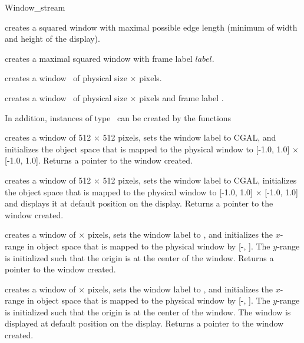 \begin{ccRefClass} {Window_stream}
\ccCreation

{creates a squared window with maximal possible edge length
(minimum of width and height of the display).}

{creates a maximal squared window with frame label $label$.}

{creates a window \ccVar\ of physical size  $\times$  pixels.}


{creates a window \ccVar\ of physical size  $\times$  pixels 
and frame label .}

In addition, instances of type \ccRefName\ can be created by the functions

{creates a window of 512 $\times$ 512 pixels, sets the window label to
CGAL, and  initializes the object space that is mapped to the physical window to
[-1.0, 1.0] $\times$ [-1.0, 1.0]. 
Returns a pointer to the window created.}

{creates a window of 512 $\times$ 512 pixels, sets the window label to
CGAL, initializes the object space that is mapped to the physical window to 
[-1.0, 1.0] $\times$ [-1.0, 1.0] and 
displays it at default position on the display. Returns a pointer to the window created.}

{creates a window of  $\times$  pixels, sets the window label to
, and  initializes the $x$-range in object space that is mapped to the physical window by
[-, ]. The $y$-range is initialized such that the origin is at
the center of the window. 
Returns a pointer to the window created.}

{creates a window of  $\times$  pixels, sets the window label to
, and initializes the $x$-range in object space that is mapped to the physical window by
[-, ]. The $y$-range is initialized such that the origin is at
the center of the window. The window is displayed at default position on the display. 
Returns a pointer to the window created.}


\end{ccRefClass}
